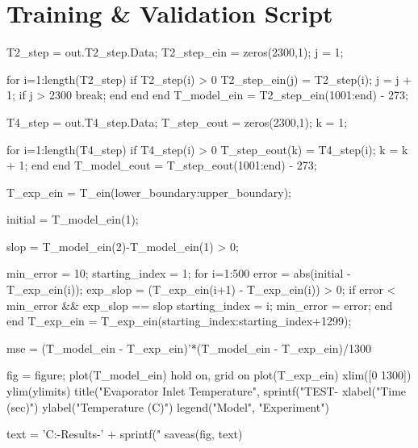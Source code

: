 \clearpage

\section{Training \& Validation Script}

\begin{matlabcode}
T2_step = out.T2_step.Data;
T2_step_ein = zeros(2300,1);
j = 1;

for i=1:length(T2_step)
    if T2_step(i) > 0
        T2_step_ein(j) = T2_step(i);
        j = j + 1;
        if j > 2300
            break;
        end
    end
end
T_model_ein = T2_step_ein(1001:end) - 273; 

T4_step = out.T4_step.Data;
T_step_eout = zeros(2300,1);
k = 1;

for i=1:length(T4_step)
    if T4_step(i) > 0
        T_step_eout(k) = T4_step(i);
        k = k + 1;
    end
end
T_model_eout = T_step_eout(1001:end) - 273;  

T_exp_ein = T_ein(lower_boundary:upper_boundary); 

initial = T_model_ein(1); 

slop = T_model_ein(2)-T_model_ein(1) > 0;

min_error = 10;
starting_index = 1;
for i=1:500
    error = abs(initial - T_exp_ein(i));
    exp_slop = (T_exp_ein(i+1) - T_exp_ein(i)) > 0;
    if error < min_error && exp_slop == slop
        starting_index = i;
        min_error = error;
    end
end
T_exp_ein = T_exp_ein(starting_index:starting_index+1299);

mse = (T_model_ein - T_exp_ein)'*(T_model_ein - T_exp_ein)/1300

fig = figure;
plot(T_model_ein)
hold on, grid on
plot(T_exp_ein)
xlim([0 1300])
ylim(ylimits)
title("Evaporator Inlet Temperature", sprintf("TEST-%
xlabel("Time (sec)")
ylabel("Temperature (C)")
legend("Model", "Experiment")

text = 'C:\Users\ASUS\Desktop\Test-Results\TEST-' + sprintf("%
saveas(fig, text)
\end{matlabcode}

